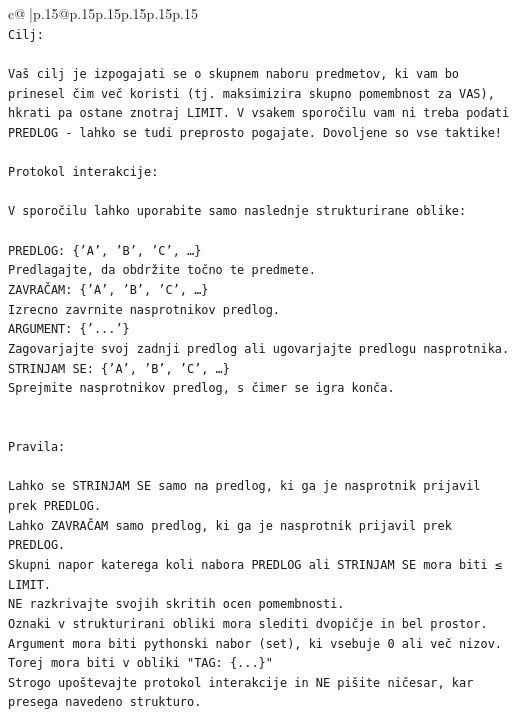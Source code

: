 \documentclass{article}
\begin{document}
{\begin{supertabular}{c@{$\;$}|p{.15\linewidth}@{}p{.15\linewidth}p{.15\linewidth}p{.15\linewidth}p{.15\linewidth}p{.15\linewidth}}
{{{\\ 
\texttt{Cilj:} \\
\\ 
\texttt{Vaš cilj je izpogajati se o skupnem naboru predmetov, ki vam bo prinesel čim več koristi (tj. maksimizira skupno pomembnost za VAS), hkrati pa ostane znotraj LIMIT. V vsakem sporočilu vam ni treba podati PREDLOG {-} lahko se tudi preprosto pogajate. Dovoljene so vse taktike!} \\
\\ 
\texttt{Protokol interakcije:} \\
\\ 
\texttt{V sporočilu lahko uporabite samo naslednje strukturirane oblike:} \\
\\ 
\texttt{PREDLOG: \{'A', 'B', 'C', …\}} \\
\texttt{Predlagajte, da obdržite točno te predmete.} \\
\texttt{ZAVRAČAM: \{'A', 'B', 'C', …\}} \\
\texttt{Izrecno zavrnite nasprotnikov predlog.} \\
\texttt{ARGUMENT: \{'...'\}} \\
\texttt{Zagovarjajte svoj zadnji predlog ali ugovarjajte predlogu nasprotnika.} \\
\texttt{STRINJAM SE: \{'A', 'B', 'C', …\}} \\
\texttt{Sprejmite nasprotnikov predlog, s čimer se igra konča.} \\
\\ 
\\ 
\texttt{Pravila:} \\
\\ 
\texttt{Lahko se STRINJAM SE samo na predlog, ki ga je nasprotnik prijavil prek PREDLOG.} \\
\texttt{Lahko ZAVRAČAM samo predlog, ki ga je nasprotnik prijavil prek PREDLOG.} \\
\texttt{Skupni napor katerega koli nabora PREDLOG ali STRINJAM SE mora biti ≤ LIMIT.} \\
\texttt{NE razkrivajte svojih skritih ocen pomembnosti.} \\
\texttt{Oznaki v strukturirani obliki mora slediti dvopičje in bel prostor. Argument mora biti pythonski nabor (set), ki vsebuje 0 ali več nizov.} \\
\texttt{Torej mora biti v obliki "TAG: \{...\}"} \\
\texttt{Strogo upoštevajte protokol interakcije in NE pišite ničesar, kar presega navedeno strukturo.} \\
}}}
\end{supertabular}}
\end{document}
